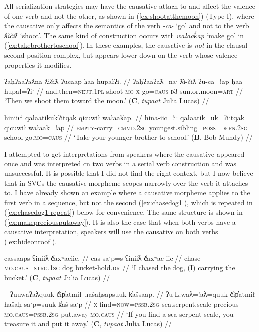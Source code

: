 All serialization strategies may have the causative attach to and affect the valence of one verb and not the other, as shown in (\ref{ex:shootatthemoon}) (Type I), where the causative only affects the semantics of the verb \textit{-ca-} `go' and not to the verb \textit{ƛ̓ičiƛ} `shoot'. The same kind of construction occurs with \textit{wałaak̓ap} `make go' in (\ref{ex:takebrothertoschool}). In these examples, the causative is \textit{not} in the clausal second-position complex, but appears lower down on the verb whose valence properties it modifies.

\ex \label{ex:shootatthemoon}
\begingl
\glpreamble ʔaḥʔaaʔaƛna ƛ̓ičiƛ ʔucaap ḥaa hupałʔi. //
\gla ʔaḥʔaaʔaƛ=naˑ ƛ̓i-čiƛ ʔu-ca=!ap ḥaa hupał=ʔiˑ //
\glb and.then=\textsc{neut.1pl} shoot-\textsc{mo} \textsc{x}-go=\textsc{caus} \textsc{d3} sun.or.moon=\textsc{art} //
\glft `Then we shoot them toward the moon.' (\textbf{C}, \textit{tupaat} Julia Lucas) //
\endgl
\xe

\ex \label{ex:takebrothertoschool}
\begingl
\glpreamble hiniic̓i qałaatikukʔitqak qicuwił wałaak̓ap. //
\gla hina-iic=!iˑ qałaatik=uk=ʔiˑtqak qicuwił wałaak=!ap //
\glb \textsc{empty}-carry=\textsc{cmmd.2sg} youngest.sibling=\textsc{poss}=\textsc{defn.2sg} school go.\textsc{mo}=\textsc{caus} //
\glft `Take your younger brother to school.' (\textbf{B}, Bob Mundy) //
\endgl
\xe

I attempted to get interpretations from speakers where the causative appeared once and was interpreted on two verbs in a serial verb construction and was unsuccessful. It is possible that I did not find the right context, but I now believe that in SVCs the causative morpheme scopes narrowly over the verb it attaches to. I have already shown an example where a causative morpheme applies to the first verb in a sequence, but not the second (\ref{ex:chasedog1}), which is repeated in (\ref{ex:chasedog1-repeat}) below for convenience. The same structure is shown in (\ref{ex:makepreciousputaway}). It is also the case that when both verbs have a causative interpretation, speakers will use the causative on both verbs (\ref{ex:hideonroof}).

\ex \label{ex:chasedog1-repeat}
\begingl
\glpreamble cassaaps ʕiniiƛ č̓axʷaciic. //
\gla cas-saˑp=s ʕiniiƛ č̓axʷac-iic //
\glb chase-\textsc{mo.caus}=\textsc{strg.1sg} dog bucket-hold.\textsc{dr} //
\glft `I chased the dog, (I) carrying the bucket.' (\textbf{C}, \textit{tupaat} Julia Lucas) //
\endgl
\xe

\ex~ \label{ex:makepreciousputaway}
\begingl
\glpreamble ʔuuwaʔaƛquuk č̓ip̓atmił\footnotemark\ hašaḥsapsuuk k̓ašsaap. //
\gla ʔu-L.waƛ=!aƛ=quuk č̓ip̓atmił hašaḥ-saˑp=suuk k̓aš-saˑp //
\glb \textsc{x}-find=\textsc{now}=\textsc{pssb.2sg} sea.serpent.scale precious-\textsc{mo.caus}=\textsc{pssb.2sg} put.away-\textsc{mo.caus} //
\glft `If you find a sea serpent scale, you treasure it and put it away.' (\textbf{C}, \textit{tupaat} Julia Lucas) //
\endgl
\xe

